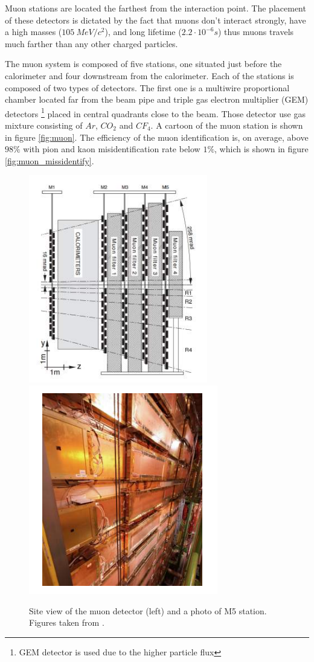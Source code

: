 Muon stations are located the farthest from the interaction point. The placement of these detectors is dictated by the fact that muons don’t interact strongly, have a high masses ($105~ MeV/c^2$), and long lifetime ($2.2 \cdot 10^{-6}s$) thus muons travels much farther than any other charged particles.  
  
The muon system is composed of five stations, one situated just before the calorimeter and four downstream from the calorimeter. Each of the stations is composed of two types of detectors. The first one is a multiwire proportional chamber located far from the beam pipe and triple gas electron multiplier (GEM) detectors \footnote{GEM detector is used due to the higher particle flux} placed in central quadrants close to the beam. Those detector use gas mixture consisting of $Ar$, $CO_2$ and $CF_4$. A cartoon of the muon station is shown in figure \ref{fig:muon}. 
The efficiency of the muon identification is, on average, above $98\%$ with pion and kaon misidentification rate below $1\%$, which is shown in figure \ref{fig:muon_missidentify}. 


\begin{figure}[h]
 \begin{center}
  \includegraphics[width=0.49\linewidth]{figures/muon_stations.PNG}
   \includegraphics[width=0.49\linewidth]{figures/muon_photo.PNG}
    \caption{Site view of the muon detector (left) and a photo of M5 station. Figures taken from \cite{lhcb}.}%
    \label{fig:RICH_performance}%
 \end{center}
\end{figure}




